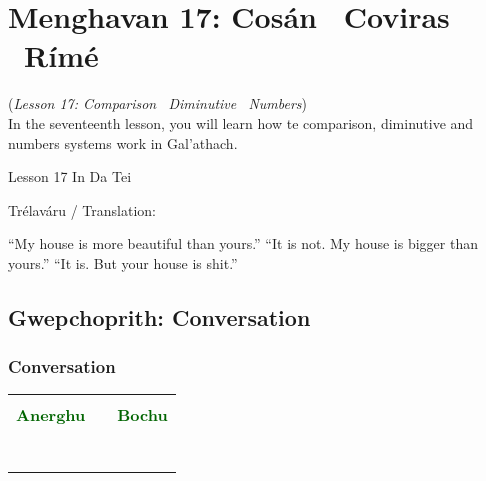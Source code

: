 \section{Menghavan 17: Cos\'{a}n \textendash\ Coviras \textendash\ R\'{i}m\'{e}}
(\textit{Lesson 17: Comparison \textendash\ Diminutive \textendash\ Numbers})\\

In the seventeenth lesson, you will learn how te comparison, diminutive and numbers systems work in Gal'{a}thach. 

Lesson 17 In Da Tei

Tr\'{e}lav\'{a}ru / Translation:

``My house is more beautiful than yours.''
``It is not. My house is bigger than yours.''
``It is. But your house is shit.''

\subsection{Gwepchoprith: Conversation}
\subsubsection{Conversation}

\begin{table}[H]
\centering
    \begin{tabular}{cM{10.0cm}c}
     &  & \\
    \textcolor{darkgreen}{\textbf{Anerghu}} &  & \textcolor{darkgreen}{\textbf{Bochu}}\\
     &  & \\
     &  & \\
     &  & \\
     &  & \\
     &  & \\
     &  & \\
     &  & 
    \end{tabular}
\end{table}

